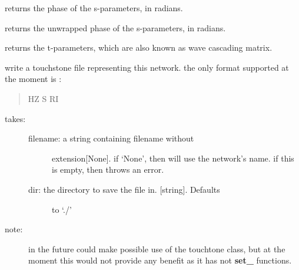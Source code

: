 \documentclass[letterpaper,10pt,english]{sphinxmanual}
\begin{document}
\begin{fulllineitems}
\begin{fulllineitems}
\label{api/mwavepy:mwavepy.network.Network.s_rad}
returns the phase of the s-parameters, in radians.

\end{fulllineitems}


\begin{fulllineitems}
\label{api/mwavepy:mwavepy.network.Network.s_rad_unwrap}
returns the unwrapped phase of the s-parameters, in radians.

\end{fulllineitems}


\begin{fulllineitems}
\label{api/mwavepy:mwavepy.network.Network.t}
returns the t-parameters, which are also known as wave cascading
matrix.

\end{fulllineitems}


\begin{fulllineitems}
\label{api/mwavepy:mwavepy.network.Network.write_touchstone}
write a touchstone file representing this network.  the only 
format supported at the moment is :
\begin{quote}

HZ S RI
\end{quote}
\begin{description}
\item[{takes: }] \leavevmode\begin{description}
\item[{filename: a string containing filename without }] \leavevmode
extension{[}None{]}. if `None', then will use the network's 
name. if this is empty, then throws an error.

\item[{dir: the directory to save the file in. {[}string{]}. Defaults }] \leavevmode
to `./'

\end{description}

\item[{note:}] \leavevmode
in the future could make possible use of the touchtone 
class, but at the moment this would not provide any benefit 
as it has not {\color{red}\bfseries{}set\_} functions.


\end{description}
\end{fulllineitems}
\end{fulllineitems}
\end{document}
